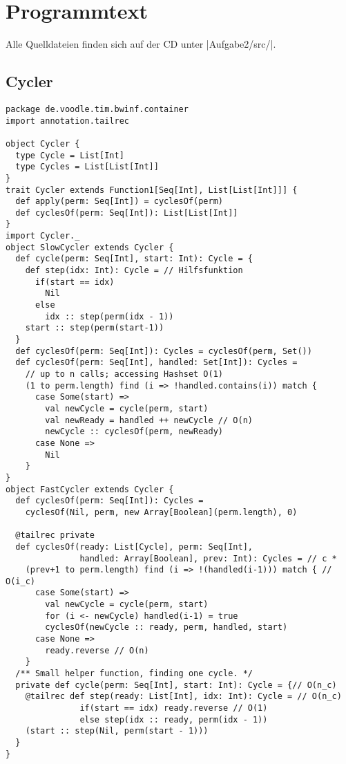 \clearpage
\addtolength{\topmargin}{-.8cm}
\enlargethispage{2.8cm}
\addtolength{\textwidth}{1.8cm}
\section{Programmtext}
\fontsize{8pt}{8.4pt}
Alle Quelldateien finden sich auf der CD unter |Aufgabe2/src/|.
\subsection{Cycler}
\lstset{basicstyle=\ttfamily\small}
\begin{lstlisting}
package de.voodle.tim.bwinf.container
import annotation.tailrec

object Cycler {
  type Cycle = List[Int]
  type Cycles = List[List[Int]]
}
trait Cycler extends Function1[Seq[Int], List[List[Int]]] {
  def apply(perm: Seq[Int]) = cyclesOf(perm)
  def cyclesOf(perm: Seq[Int]): List[List[Int]]
}
import Cycler._
object SlowCycler extends Cycler {
  def cycle(perm: Seq[Int], start: Int): Cycle = {
    def step(idx: Int): Cycle = // Hilfsfunktion
      if(start == idx)
        Nil
      else
        idx :: step(perm(idx - 1))
    start :: step(perm(start-1))
  }
  def cyclesOf(perm: Seq[Int]): Cycles = cyclesOf(perm, Set())
  def cyclesOf(perm: Seq[Int], handled: Set[Int]): Cycles =
    // up to n calls; accessing Hashset O(1)
    (1 to perm.length) find (i => !handled.contains(i)) match {
      case Some(start) =>
        val newCycle = cycle(perm, start)
        val newReady = handled ++ newCycle // O(n)
        newCycle :: cyclesOf(perm, newReady)
      case None =>
        Nil
    }
}
object FastCycler extends Cycler {
  def cyclesOf(perm: Seq[Int]): Cycles =
    cyclesOf(Nil, perm, new Array[Boolean](perm.length), 0)

  @tailrec private
  def cyclesOf(ready: List[Cycle], perm: Seq[Int],
               handled: Array[Boolean], prev: Int): Cycles = // c *
    (prev+1 to perm.length) find (i => !(handled(i-1))) match { // O(i_c)
      case Some(start) =>
        val newCycle = cycle(perm, start)
        for (i <- newCycle) handled(i-1) = true
        cyclesOf(newCycle :: ready, perm, handled, start)
      case None =>
        ready.reverse // O(n)
    }
  /** Small helper function, finding one cycle. */
  private def cycle(perm: Seq[Int], start: Int): Cycle = {// O(n_c)
    @tailrec def step(ready: List[Int], idx: Int): Cycle = // O(n_c)
               if(start == idx) ready.reverse // O(1)
               else step(idx :: ready, perm(idx - 1))
    (start :: step(Nil, perm(start - 1)))
  }
}
\end{lstlisting}
\clearpage
